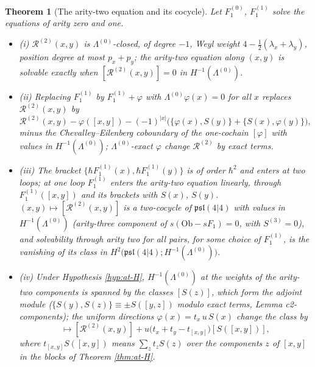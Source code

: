 \documentclass[11pt]{article}
\numberwithin{equation}{section}
\theoremstyle{plain}
\newtheorem{theorem}{Theorem}[section]
\theoremstyle{definition}
\newcommand{\Ob}{\mathrm{Ob}}
\begin{document}
\begin{theorem}[The arity-two equation and its cocycle]
\label{thm:at-eq2}
Let $F_1^{(0)}$, $F_1^{(1)}$ solve the equations of arity zero and one.
\begin{itemize}
\item (i) $\mathcal R^{(2)}(x,y)$ is $\Lambda^{(0)}$-closed, of degree $-1$, Weyl weight $4-\tfrac12(\lambda_x+\lambda_y)$, position degree at most $p_x+p_y$; the arity-two equation along $(x,y)$ is solvable exactly when $[\mathcal R^{(2)}(x,y)]=0$ in $H^{-1}(\Lambda^{(0)})$.
\item (ii) Replacing $F_1^{(1)}$ by $F_1^{(1)}+\varphi$ with $\Lambda^{(0)}\varphi(x)=0$ for all $x$ replaces $\mathcal R^{(2)}(x,y)$ by
\[
\mathcal R^{(2)}(x,y)-\varphi([x,y])-(-1)^{|x|}\big(\{\varphi(x),S(y)\}+\{S(x),\varphi(y)\}\big),
\]
minus the Chevalley--Eilenberg coboundary of the one-cochain $[\varphi]$ with values in $H^{-1}(\Lambda^{(0)})$; $\Lambda^{(0)}$-exact $\varphi$ change $\mathcal R^{(2)}$ by exact terms.
\item (iii) The bracket $\{\hbar F_1^{(1)}(x),\hbar F_1^{(1)}(y)\}$ is of order $\hbar^2$ and enters at two loops; at one loop $F_1^{(1)}$ enters the arity-two equation linearly, through $F_1^{(1)}([x,y])$ and its brackets with $S(x)$, $S(y)$. $(x,y)\mapsto[\mathcal R^{(2)}(x,y)]$ is a two-cocycle of $\mathfrak{psl}(4|4)$ with values in $H^{-1}(\Lambda^{(0)})$ (arity-three component of $s(\Ob-sF_1)=0$, with $S^{(3)}=0$), and solvability through arity two for all pairs, for some choice of $F_1^{(1)}$, is the vanishing of its class in $H^2\big(\mathfrak{psl}(4|4);H^{-1}(\Lambda^{(0)})\big)$.
\item (iv) Under Hypothesis \ref{hyp:at-H}, $H^{-1}(\Lambda^{(0)})$ at the weights of the arity-two components is spanned by the classes $[S(z)]$, which form the adjoint module ($\{S(y),S(z)\}\equiv\pm S([y,z])$ modulo exact terms, Lemma c2-components); the uniform directions $\varphi(x)=t_x\,u\,S(x)$ change the class by
\begin{equation}
[\mathcal R^{(2)}(x,y)]\longmapsto[\mathcal R^{(2)}(x,y)]+u\big(t_x+t_y-t_{[x,y]}\big)[S([x,y])],
\label{eq:at-tshift}
\end{equation}
where $t_{[x,y]}S([x,y])$ means $\sum_z t_zS(z)$ over the components $z$ of $[x,y]$ in the blocks of Theorem \ref{thm:at-H}.
\end{itemize}
\end{theorem}
\end{document}
